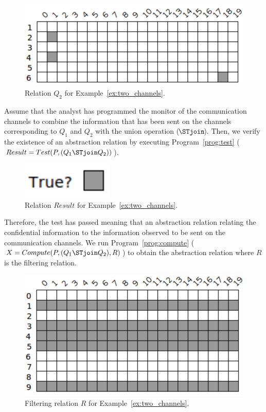 \begin{example}
	\begin{figure}[ht]
		\centering
		\includegraphics[scale=0.65]{Figures/PDF/Relview/Q2.pdf}
		\caption{Relation $Q_2$ for Example~\ref{ex:two_channels}.}
		\label{fig:two_channels_q2}
	\end{figure}
	
	\newpage
	Assume that the analyst has programmed the monitor of the communication channels to combine the information that has been sent on the channels corresponding to $Q_1$ and $Q_2$ with the union operation ( $\!\!\!\STjoin\!\!\!$ ). Then, we verify the existence of an abstraction relation by executing Program~\ref{prog:test} ($Result = Test(P, (Q_1 \STjoin Q_2))$). \newline
	
	\begin{figure}[ht]
		\centering
		\includegraphics[scale=0.65]{Figures/PDF/Relview/True.pdf}
		\caption{Relation $Result$ for Example~\ref{ex:two_channels}.}
		\label{fig:two_channels_result}
	\end{figure}

	Therefore, the test has passed meaning that an abstraction relation relating the confidential information to the information observed to be sent on the communication channels. We run Program~\ref{prog:compute} ($X = Compute(P,(Q_1 \STjoin Q_2),R)$) to obtain the abstraction relation where $R$ is the filtering relation. \newline

	\begin{figure}[ht]
		\centering
		\includegraphics[scale=0.65]{Figures/PDF/Relview/R.pdf}
		\caption{Filtering relation $R$ for Example~\ref{ex:two_channels}.}
		\label{fig:two_channels_r}
	\end{figure}
	

\end{example}
